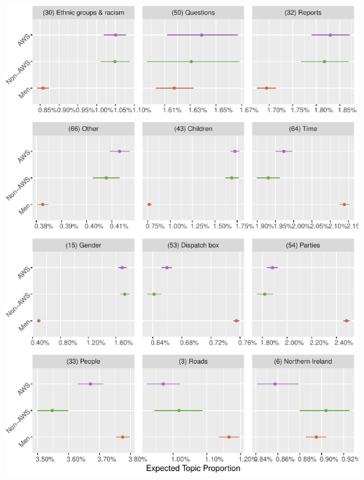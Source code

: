\documentclass[]{article}
\let\origfigure\figure
\let\endorigfigure\endfigure
\renewenvironment{figure}[1][2] {
    \expandafter\origfigure\expandafter[H]
} {
    \endorigfigure
}
\theoremstyle{definition}
\theoremstyle{definition}
\theoremstyle{definition}
\theoremstyle{remark}
\begin{document}
\begin{figure}
\centering
\includegraphics{methodology_files/figure-latex/p-effect2-1.pdf}
\caption{\label{fig:p-effect2}Where AWS MPs are most similar to non-AWS
female MPs}
\end{figure}
\end{document}
